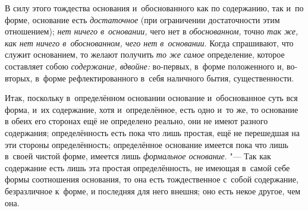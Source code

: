 В силу этого тождества основания и~обоснованного как по содержанию, так и~по
форме, основание есть {\em достаточное} (при ограничении достаточности этим
отношением); {\em нет ничего в~основании,} чего нет в {\em обоснованном,} точно
{\em так же, как нет ничего в~обоснованном, чего нет в~основании}. Когда
спрашивают, что служит основанием, то желают получить {\em то же самое}
определение, которое составляет собою {\em содержание, вдвойне:} во-первых,
в~форме положенного и, во-вторых, в~форме рефлектированного в~себя наличного
бытия, существенности.

Итак, поскольку в~определённом основании основание и~обоснованное суть вся
форма, и~их содержание, хотя и~определённое, есть одно и~то же, то основание в
обеих его сторонах ещё не определено реально, они не имеют разного содержания;
определённость есть пока что лишь простая, ещё не перешедшая на эти стороны
определённость; определённое основание имеется пока что лишь в~своей чистой
форме, имеется лишь {\em формальное основание}. "--- Так как содержание есть
лишь эта простая определённость, не имеющая в~самой себе формы соотношения
основания, то она есть тождественное с~собой содержание, безразличное к~форме,
и последняя для него внешня; оно есть некое другое, чем она.


